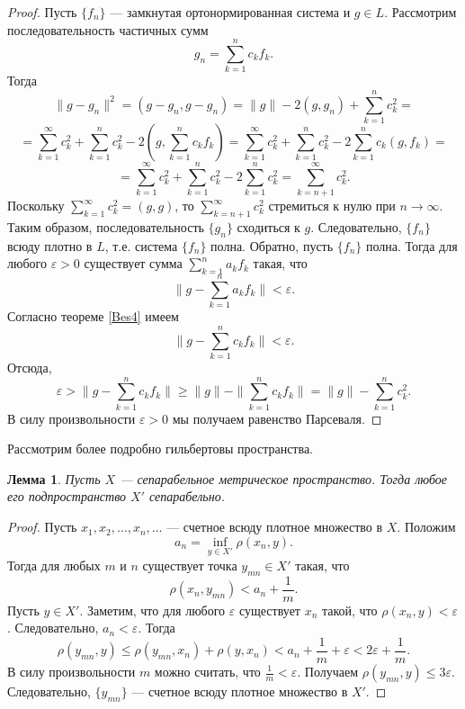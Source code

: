 \documentclass[12pt, titlepage, oneside]{amsbook}
\newtheorem{lemma}[theorem]{Лемма}
\theoremstyle{definition}
\theoremstyle{remark}
\begin{document}
\begin{proof}
	Пусть $\{f_n\}$ --- замкнутая ортонормированная система и $g\in L$. Рассмотрим последовательность частичных сумм $$g_n=\sum\limits_{k=1}^n c_k f_k.$$ Тогда $$\|g-g_n\|^2=(g-g_n,g-g_n)=\|g\|-2(g,g_n)+\sum\limits_{k=1}^n c^2_k=$$ $$=\sum\limits_{k=1}^{\infty} c^2_k+\sum\limits_{k=1}^n c^2_k-2\left(g,\sum\limits_{k=1}^n c_k f_k\right)=\sum\limits_{k=1}^{\infty} c^2_k+\sum\limits_{k=1}^n c^2_k-2\sum\limits_{k=1}^n c_k(g,f_k)=$$ $$=\sum\limits_{k=1}^{\infty} c^2_k+\sum\limits_{k=1}^n c^2_k-2\sum\limits_{k=1}^n c^2_k=\sum\limits_{k=n+1}^{\infty} c^2_k.$$ Поскольку $\sum\limits_{k=1}^{\infty} c_k^2=(g,g)$, то $\sum\limits_{k=n+1}^{\infty} c^2_k$ стремиться к нулю при $n\rightarrow\infty$. Таким образом, последовательность $\{g_n\}$ сходиться к $g$. Следовательно, $\{f_n\}$ всюду плотно в $L$, т.е. система $\{f_n\}$ полна. Обратно, пусть $\{f_n\}$ полна. Тогда для любого $\varepsilon>0$ существует сумма $\sum\limits_{k=1}^{n} a_k f_k$ такая, что $$\|g-\sum\limits_{k=1}^{n} a_k f_k\|<\varepsilon.$$ Согласно теореме \ref{Bes4} имеем $$\|g-\sum\limits_{k=1}^{n} c_k f_k\|<\varepsilon.$$ Отсюда, $$\varepsilon>\|g-\sum\limits_{k=1}^{n} c_k f_k\|\geq\|g\|-\|\sum\limits_{k=1}^{n} c_k f_k\|=\|g\|-\sum\limits_{k=1}^{n} c^2_k.$$ В силу произвольности $\varepsilon>0$ мы получаем равенство Парсеваля.
\end{proof}

Рассмотрим более подробно гильбертовы пространства.

\begin{lemma}
	\label{LHil1}
	Пусть $X$ --- сепарабельное метрическое пространство. Тогда любое его подпространство $X'$ сепарабельно.
\end{lemma}

\begin{proof}
	Пусть $x_1,x_2,\ldots,x_n,\ldots$ --- счетное всюду плотное множество в $X$. Положим $$a_n=\inf\limits_{y\in X'}\rho(x_n,y).$$ Тогда для любых $m$ и $n$ существует точка $y_{mn}\in X'$ такая, что $$\rho(x_n,y_{mn})<a_n+\frac{1}{m}.$$ Пусть $y\in X'$. Заметим, что для любого $\varepsilon$ существует $x_n$ такой, что $\rho(x_n,y)<\varepsilon$. Следовательно, $a_n<\varepsilon$. Тогда $$\rho(y_{mn},y)\leq\rho(y_{mn},x_n)+\rho(y,x_n)<a_n+\frac{1}{m}+\varepsilon<2\varepsilon+\frac{1}{m}.$$ В силу произвольности $m$ можно считать, что $\frac{1}{m}<\varepsilon$. Получаем $\rho(y_{mn},y)\leq3\varepsilon$. Следовательно, $\{y_{mn}\}$ --- счетное всюду плотное множество в $X'$.
\end{proof}
\end{document}
